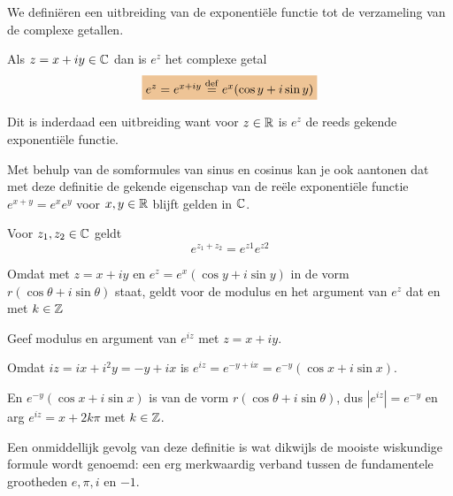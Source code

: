 \documentclass{ximera}
\begin{document}
	\author{Zomercursus KU Leuven}
	
	\label{xim:complexe_getallen_exponentieel}

We definiëren een uitbreiding van de exponentiële functie tot de verzameling van de complexe getallen.

\begin{definition}
Als $z=x+iy \in \mathbb{C}$ dan is $e^z$ het complexe getal 
$$
\important{e^z = e^{x+iy} \perdef  e^x (\cos y + i \sin y)}
$$ 
\end{definition}

Dit is inderdaad een uitbreiding want voor $z \in \mathbb{R}$ is $e^z$ de reeds gekende exponentiële functie. 

Met behulp van de somformules van sinus en cosinus kan je ook aantonen dat met deze definitie de gekende eigenschap van de reële exponentiële functie $e^{x+y}=e^x e^y$ voor $x,y \in \mathbb{R}$ blijft gelden in $\mathbb{C}$.

\begin{proposition}
    Voor $z_1,z_2 \in \mathbb{C}$ geldt $$e^{z_1+z_2}=e^{z1} e^{z2}$$
\end{proposition}

\begin{remark}
Omdat met $z=x+iy$ en $e^z = e^x (\cos y + i \sin y)$ in de vorm $r (\cos \theta + i \sin \theta )$ staat,
geldt voor de modulus en het argument van $e^z$ dat 
     en 
     met $k \in \mathbb{Z}$
\end{remark}

\begin{exercise} Geef modulus en argument van $e^{iz}$ met $z=x+iy$.
\begin{oplossing}
Omdat $iz=ix+i^2y = -y + ix$ is $e^{iz}= e^{-y+ix} = e^{-y} (\cos x +i \sin x)$. 

En $e^{-y} (\cos x +i \sin x)$ is van de vorm $r (\cos \theta + i \sin \theta )$, dus
 $|e^{iz}| = e^{-y}$ en  arg $e^{iz} = x + 2k \pi$ met $k \in \mathbb{Z}$.
\end{oplossing}
\end{exercise}

Een onmiddellijk gevolg van deze definitie is wat dikwijls de mooiste wiskundige formule wordt genoemd: een erg merkwaardig verband tussen de fundamentele grootheden $e,\pi,i$ en $ -1$. 
\begin{proposition}
\end{proposition}
\end{document}
